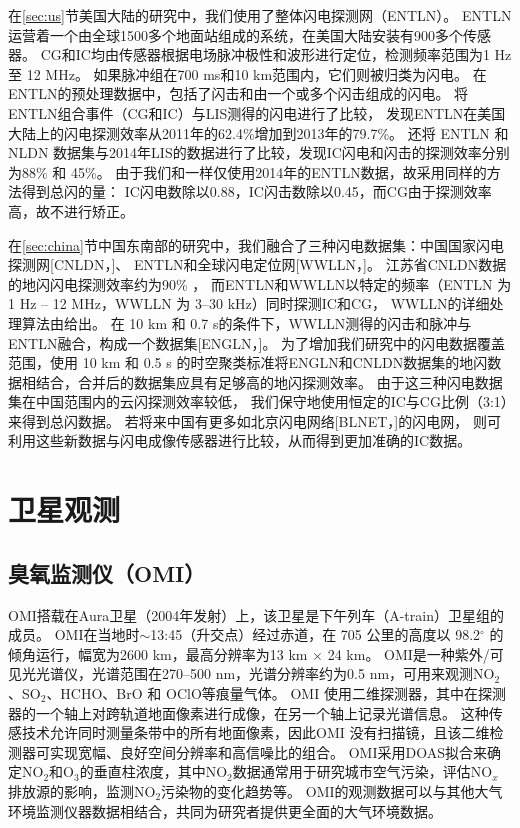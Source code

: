 在\ref{sec:us}节美国大陆的研究中，我们使用了整体闪电探测网（ENTLN）。
ENTLN运营着一个由全球1500多个地面站组成的系统，在美国大陆安装有900多个传感器\citep{Zhu.2017,Marchand.2019}。
CG和IC均由传感器根据电场脉冲极性和波形进行定位，检测频率范围为1 Hz 至 12 MHz。
如果脉冲组在700 ms和10 km范围内，它们则被归类为闪电。
在ENTLN的预处理数据中，包括了闪击和由一个或多个闪击组成的闪电。
\citet{Rudlosky.2015}将ENTLN组合事件（CG和IC）与LIS测得的闪电进行了比较，
发现ENTLN在美国大陆上的闪电探测效率从2011年的62.4\%增加到2013年的79.7\%。
\citet{Lapierre.2020}还将 ENTLN 和 NLDN 数据集与2014年LIS的数据进行了比较，发现IC闪电和闪击的探测效率分别为88\% 和 45\%。
由于我们和\citet{Lapierre.2020}一样仅使用2014年的ENTLN数据，故采用同样的方法得到总闪的量：
IC闪电数除以0.88，IC闪击数除以0.45，而CG由于探测效率高，故不进行矫正。

在\ref{sec:china}节中国东南部的研究中，我们融合了三种闪电数据集：中国国家闪电探测网[CNLDN，\citet{Yang.2015}]、
ENTLN和全球闪电定位网[WWLLN，\citet{Rodger.2006}]。
江苏省CNLDN数据的地闪闪电探测效率约为90\% \citep{Li.2017a}，
而ENTLN和WWLLN以特定的频率（ENTLN 为 1 Hz -- 12 MHz，WWLLN 为 3--30 kHz）同时探测IC和CG，
WWLLN的详细处理算法由\citet{Rodger.2004}给出。
在 10 km 和 0.7 s的条件下，WWLLN测得的闪击和脉冲与ENTLN融合，构成一个数据集[ENGLN，\citet{Virts.2020b}]。
为了增加我们研究中的闪电数据覆盖范围，使用 10 km 和 0.5 s 的时空聚类标准将ENGLN和CNLDN数据集的地闪数据相结合\citep{Zhao.2020}，合并后的数据集应具有足够高的地闪探测效率。
由于这三种闪电数据集在中国范围内的云闪探测效率较低，
我们保守地使用恒定的IC与CG比例（3:1）来得到总闪数据\citep{Wu.2016,Bandholnopparat.2020}。
若将来中国有更多如北京闪电网络[BLNET，\citet{Srivastava.2017}]的闪电网，
则可利用这些新数据与闪电成像传感器进行比较\citep{Rudlosky.2013,Poelman.2020}，从而得到更加准确的IC数据。

\section{卫星观测}

\subsection{臭氧监测仪（OMI）}

OMI搭载在Aura卫星（2004年发射）上，该卫星是下午列车（A-train）卫星组的成员\citep{Levelt.2006,Levelt.2018}。
OMI在当地时$\sim$13:45（升交点）经过赤道，在 705 公里的高度以 98.2$^{\circ}$ 的倾角运行，幅宽为2600 km，最高分辨率为13 km $\times$ 24 km。
OMI是一种紫外/可见光光谱仪，光谱范围在270--500 nm，光谱分辨率约为0.5 nm，可用来观测NO$_2$、SO$_2$、HCHO、BrO 和 OClO等痕量气体。
OMI 使用二维探测器，其中在探测器的一个轴上对跨轨道地面像素进行成像，在另一个轴上记录光谱信息。 这种传感技术允许同时测量条带中的所有地面像素，因此OMI 没有扫描镜，且该二维检测器可实现宽幅、良好空间分辨率和高信噪比的组合。
OMI采用DOAS拟合来确定NO$_2$和O$_3$的垂直柱浓度，其中NO$_2$数据通常用于研究城市空气污染，评估NO$_x$排放源的影响，监测NO$_2$污染物的变化趋势等。
OMI的观测数据可以与其他大气环境监测仪器数据相结合，共同为研究者提供更全面的大气环境数据。

